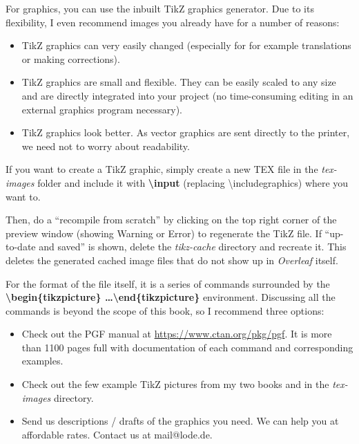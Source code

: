 For graphics, you can use the inbuilt TikZ graphics generator. Due to its flexibility, I even recommend images you already have for a number of reasons:

\begin{itemize}
\item TikZ graphics can very easily changed (especially for for example translations or making corrections).
\item TikZ graphics are small and flexible. They can be easily scaled to any size and are directly integrated into your project (no time-consuming editing in an external graphics program necessary).
\item TikZ graphics look better. As vector graphics are sent directly to the printer, we need not to worry about readability.
\end{itemize}

If you want to create a TikZ graphic, simply create a new TEX file in the \textit{tex-images} folder and include it with \textbf{\textbackslash input} (replacing \textbackslash includegraphics) where you want to. 

Then, do a ``recompile from scratch'' by clicking on the top right corner of the preview window (showing Warning or Error) to regenerate the TikZ file. If ``up-to-date and saved'' is shown, delete the \textit{tikz-cache} directory and recreate it. This deletes the generated cached image files that do not show up in \textit{Overleaf} itself.

For the format of the file itself, it is a series of commands surrounded by the \textbf{\textbackslash begin\{tikzpicture\} \dots \textbackslash end\{tikzpicture\}} environment. Discussing all the commands is beyond the scope of this book, so I recommend three options:

\begin{itemize}
\item Check out the PGF manual at \url{https://www.ctan.org/pkg/pgf}. It is more than 1100 pages full with documentation of each command and corresponding examples.
\item Check out the few example TikZ pictures from my two books  and  in the \textit{tex-images} directory.
\item Send us descriptions / drafts of the graphics you need. We can help you at affordable rates. Contact us at mail@lode.de.
\end{itemize}